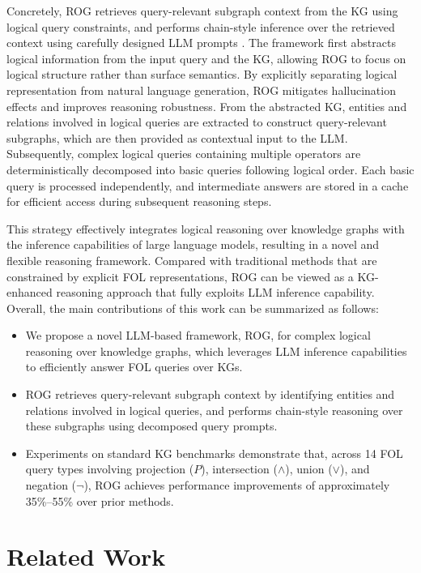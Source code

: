\documentclass[11pt]{article}
\begin{document}
Concretely, ROG retrieves query-relevant subgraph context from the KG using logical query constraints, and performs chain-style inference over the retrieved context using carefully designed LLM prompts \citep{huang2024trustworthy}.
The framework first abstracts logical information from the input query and the KG, allowing ROG to focus on logical structure rather than surface semantics.
By explicitly separating logical representation from natural language generation, ROG mitigates hallucination effects and improves reasoning robustness.
From the abstracted KG, entities and relations involved in logical queries are extracted to construct query-relevant subgraphs, which are then provided as contextual input to the LLM.
Subsequently, complex logical queries containing multiple operators are deterministically decomposed into basic queries following logical order.
Each basic query is processed independently, and intermediate answers are stored in a cache for efficient access during subsequent reasoning steps.

This strategy effectively integrates logical reasoning over knowledge graphs with the inference capabilities of large language models, resulting in a novel and flexible reasoning framework.
Compared with traditional methods that are constrained by explicit FOL representations, ROG can be viewed as a KG-enhanced reasoning approach that fully exploits LLM inference capability.
Overall, the main contributions of this work can be summarized as follows:
\begin{itemize}
  \item We propose a novel LLM-based framework, ROG, for complex logical reasoning over knowledge graphs, which leverages LLM inference capabilities to efficiently answer FOL queries over KGs.
  \item ROG retrieves query-relevant subgraph context by identifying entities and relations involved in logical queries, and performs chain-style reasoning over these subgraphs using decomposed query prompts.
  \item Experiments on standard KG benchmarks demonstrate that, across 14 FOL query types involving projection ($P$), intersection ($\wedge$), union ($\vee$), and negation ($\neg$), ROG achieves performance improvements of approximately 35\%--55\% over prior methods.
\end{itemize}




\section{Related Work}
\end{document}

